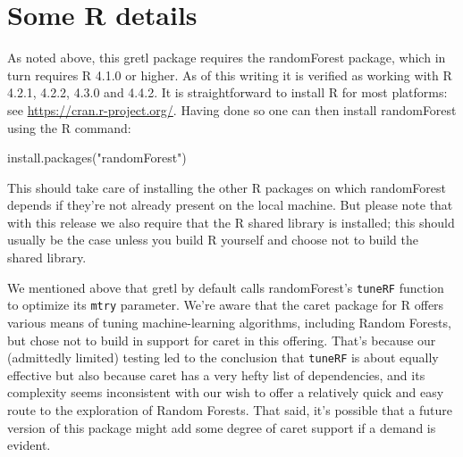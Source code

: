 \documentclass{article}
\begin{document}
\section{Some \textsf{R} details}
\label{sec:Rdetails}

As noted above, this gretl package requires the \textsf{randomForest}
package, which in turn requires \textsf{R} 4.1.0 or higher. As of this
writing it is verified as working with \textsf{R} 4.2.1, 4.2.2, 4.3.0
and 4.4.2. It is straightforward to install \textsf{R} for most
platforms: see \url{https://cran.r-project.org/}. Having done so one
can then install \textsf{randomForest} using the \textsf{R} command:
\begin{code}
install.packages("randomForest")
\end{code}
This should take care of installing the other \textsf{R} packages on
which \textsf{randomForest} depends if they're not already present on
the local machine. But please note that with this release we also
require that the \textsf{R} shared library is installed; this should
usually be the case unless you build \textsf{R} yourself and choose
not to build the shared library.

We mentioned above that gretl by default calls \textsf{randomForest}'s
\texttt{tuneRF} function to optimize its \texttt{mtry}
parameter. We're aware that the \textsf{caret} package for \textsf{R}
offers various means of tuning machine-learning algorithms, including
Random Forests, but chose not to build in support for \textsf{caret}
in this offering. That's because our (admittedly limited) testing led
to the conclusion that \texttt{tuneRF} is about equally effective but
also because \textsf{caret} has a very hefty list of dependencies, and
its complexity seems inconsistent with our wish to offer a relatively
quick and easy route to the exploration of Random Forests. That said,
it's possible that a future version of this package might add some
degree of \textsf{caret} support if a demand is evident.
\end{document}
